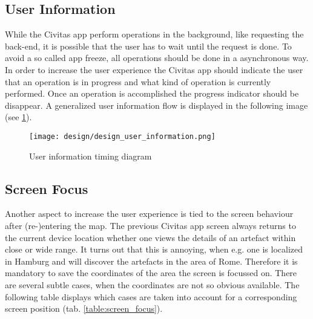 \subsection{User Information}
While the Civitas app perform operations in the background, like requesting the back-end, it is possible that the user has to wait until the request is done. To avoid a so called app freeze, all operations should be done in a asynchronous way. In order to increase the user experience the Civitas app should indicate the user that an operation is in progress and what kind of operation is currently performed. Once an operation is accomplished the progress indicator should be disappear. A generalized user information flow is displayed in the following image (see \ref{fig:design_user_information}).

\begin{figure}[H]
	\centering \texttt{[image: design/design\_user\_information.png]}
	\caption{User information timing diagram}	
	\label{fig:design_user_information}
\end{figure}


\subsection{Screen Focus}
Another aspect to increase the user experience is tied to the screen behaviour after (re-)entering the map. The previous Civitas app screen always returns to the current device location whether one views the details of an artefact within close or wide range. It turns out that this is annoying, when e.g. one is localized in Hamburg and will discover the artefacts in the area of Rome. Therefore it is mandatory to save the coordinates of the area the screen is focussed on. There are several subtle cases, when the coordinates are not so obvious available. The following table displays which cases are taken into account for a corresponding screen position (tab. \ref{table:screen_focus}).

